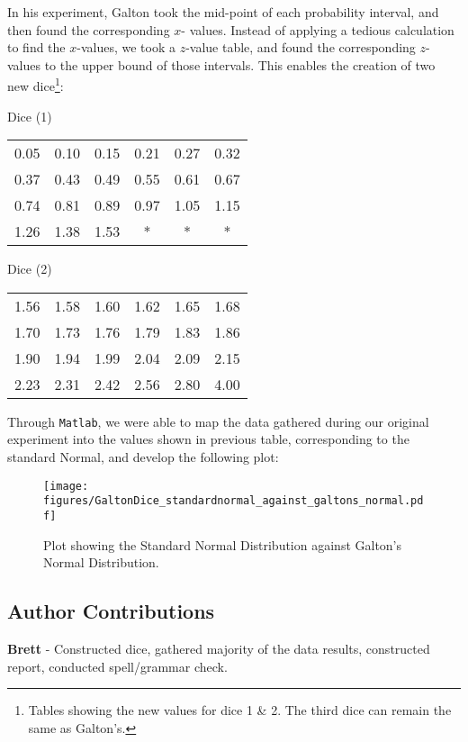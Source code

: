 In his experiment, Galton took the mid-point of each probability interval, and then found the corresponding $x$- values. Instead of applying a tedious calculation to find the $x$-values, we took a $z$-value table, and found the corresponding $z$-values to the upper bound of those intervals. This enables the creation of two new dice\footnote{Tables showing the new values for dice 1 \& 2. The third dice can remain the same as Galton's.}:
\newline

Dice (1)
\begin{tabular}{|cccccc|}\hline
0.05	&0.10	&0.15&	0.21&	0.27&	0.32\\
0.37&	0.43&	0.49&	0.55&	0.61&	0.67\\
0.74	&0.81&	0.89&	0.97&	1.05&	1.15\\
1.26	&1.38	&1.53& 	*&	*&	*\\\hline
\end{tabular}


Dice (2)
\begin{tabular}{|cccccc|}\hline
1.56&	1.58&	1.60&	1.62&	1.65&	1.68\\
1.70	&1.73&	1.76&	1.79&	1.83&	1.86\\
1.90&	1.94	&1.99	&2.04&	2.09	&2.15\\
2.23	&2.31	&2.42&	2.56&	2.80	&4.00\\\hline
\end{tabular}




Through {\tt Matlab}, we were able to map the data gathered during our original experiment into the values shown in previous table, corresponding to the standard Normal, and develop the following plot: 

\begin{figure}[thp]
\begin{center}
\texttt{[image: figures/GaltonDice\_standardnormal\_against\_galtons\_normal.pdf]}
\caption{Plot showing the Standard Normal Distribution against Galton's Normal Distribution.}
\end{center}
\end{figure}


\subsection*{Author Contributions}
\textbf{Brett} - Constructed dice, gathered majority of the data results, constructed report, conducted spell/grammar check.

